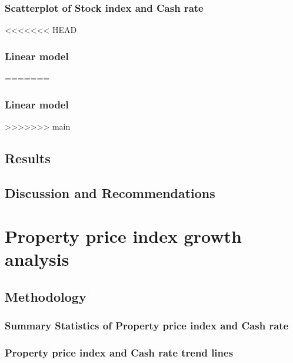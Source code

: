 \documentclass[11pt,a4paper,]{article}
\begin{document}
\hypertarget{scatterplot-of-stock-index-and-cash-rate}{%
\subsubsection{Scatterplot of Stock index and Cash rate}\label{scatterplot-of-stock-index-and-cash-rate}}

<<<<<<< HEAD
\hypertarget{linear-model-2}{%
\subsubsection{Linear model}\label{linear-model-2}}
=======
\hypertarget{linear-model-3}{%
\subsubsection{Linear model}\label{linear-model-3}}
>>>>>>> main

\hypertarget{results-3}{%
\subsection{Results}\label{results-3}}

\hypertarget{discussion-and-recommendations-3}{%
\subsection{Discussion and Recommendations}\label{discussion-and-recommendations-3}}

\hypertarget{property-price-index-growth-analysis}{%
\section{Property price index growth analysis}\label{property-price-index-growth-analysis}}

\hypertarget{methodology-4}{%
\subsection{Methodology}\label{methodology-4}}

\hypertarget{summary-statistics-of-property-price-index-and-cash-rate}{%
\subsubsection{Summary Statistics of Property price index and Cash rate}\label{summary-statistics-of-property-price-index-and-cash-rate}}

\hypertarget{property-price-index-and-cash-rate-trend-lines}{%
\subsubsection{Property price index and Cash rate trend lines}\label{property-price-index-and-cash-rate-trend-lines}}
\end{document}
